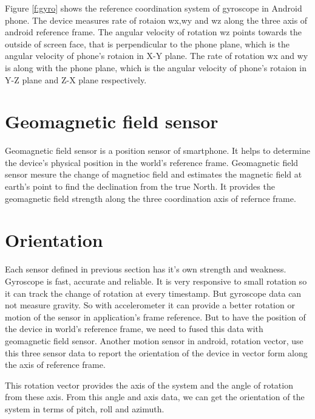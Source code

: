 Figure \ref{f:gyro} shows the reference coordination system of gyroscope in Android phone.
The device measures rate of rotaion wx,wy and wz along the three axis of android reference frame.
The angular velocity of rotation wz points towards the outside of screen face, that is perpendicular to the phone plane, which is the angular velocity of phone's rotaion in X-Y plane.
The rate of rotation wx and wy is along with the phone plane, which is the angular velocity of phone's rotaion in Y-Z plane and Z-X plane respectively.

\section{Geomagnetic field sensor}
Geomagnetic field sensor is a position sensor of smartphone.
It helps to determine the device's physical position in the world's reference frame.
Geomagnetic field sensor mesure the change of magnetioc field and estimates the magnetic field at earth's point to find the declination from the true North.
It provides the geomagnetic field strength along the three coordination axis of refernce frame.


\section{Orientation}
Each sensor defined in previous section has it's own strength and weakness.
Gyroscope is fast, accurate and reliable.
It is very responsive to small rotation so it can track the change of rotation at every timestamp.
But gyroscope data can not measure gravity.
So with accelerometer it can provide a better rotation or motion of the sensor in application's frame reference.
But to have the position of the device in world's reference frame, we need to fused this data with geomagnetic field sensor.
Another motion sensor in android, rotation vector, use this three sensor data to report the orientation of the device in vector form along the axis of reference frame.

This rotation vector provides the axis of the system and the angle of rotation from these axis.
From this angle and axis data, we can get the orientation of the system in terms of pitch, roll and azimuth.

